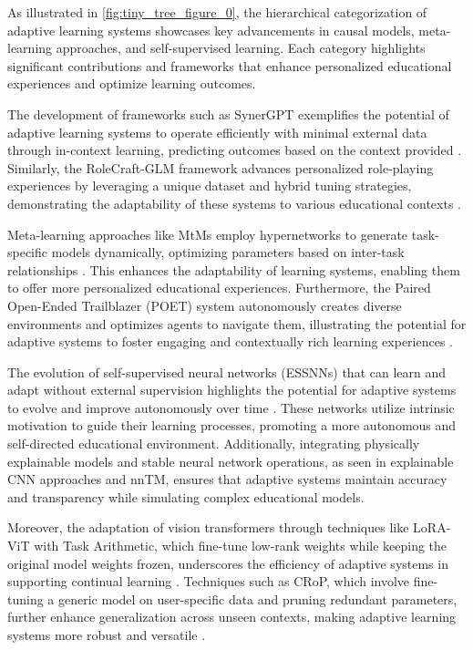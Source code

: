 As illustrated in \autoref{fig:tiny_tree_figure_0}, the hierarchical categorization of adaptive learning systems showcases key advancements in causal models, meta-learning approaches, and self-supervised learning. Each category highlights significant contributions and frameworks that enhance personalized educational experiences and optimize learning outcomes.

The development of frameworks such as SynerGPT exemplifies the potential of adaptive learning systems to operate efficiently with minimal external data through in-context learning, predicting outcomes based on the context provided \cite{edwards2023synergptincontextlearningpersonalized}. Similarly, the RoleCraft-GLM framework advances personalized role-playing experiences by leveraging a unique dataset and hybrid tuning strategies, demonstrating the adaptability of these systems to various educational contexts \cite{tao2024rolecraftglmadvancingpersonalizedroleplaying}.

Meta-learning approaches like MtMs employ hypernetworks to generate task-specific models dynamically, optimizing parameters based on inter-task relationships \cite{stank2024designingtimeseriesmodelshypernetworks}. This enhances the adaptability of learning systems, enabling them to offer more personalized educational experiences. Furthermore, the Paired Open-Ended Trailblazer (POET) system autonomously creates diverse environments and optimizes agents to navigate them, illustrating the potential for adaptive systems to foster engaging and contextually rich learning experiences \cite{wang2019pairedopenendedtrailblazerpoet}.

The evolution of self-supervised neural networks (ESSNNs) that can learn and adapt without external supervision highlights the potential for adaptive systems to evolve and improve autonomously over time \cite{le2019evolvingselfsupervisedneuralnetworks}. These networks utilize intrinsic motivation to guide their learning processes, promoting a more autonomous and self-directed educational environment. Additionally, integrating physically explainable models and stable neural network operations, as seen in explainable CNN approaches and nnTM, ensures that adaptive systems maintain accuracy and transparency while simulating complex educational models.

Moreover, the adaptation of vision transformers through techniques like LoRA-ViT with Task Arithmetic, which fine-tune low-rank weights while keeping the original model weights frozen, underscores the efficiency of adaptive systems in supporting continual learning \cite{chitale2023taskarithmeticloracontinual}. Techniques such as CRoP, which involve fine-tuning a generic model on user-specific data and pruning redundant parameters, further enhance generalization across unseen contexts, making adaptive learning systems more robust and versatile \cite{kaur2024cropcontextwiserobuststatic}.

